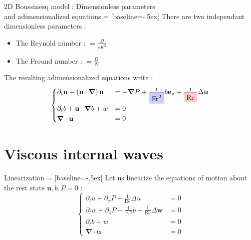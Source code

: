 \documentclass[10pt]{beamer}
\newcommand{\NodeFill}[3]{\tikz[baseline]{\node[fill=#1!20,anchor=base](#2){#3};}}
\begin{document}
\begin{frame}[fragile]{2D Boussinesq model : Dimensionless parameters \\and adimensionalized equations}
   = [baseline=-.5ex]
  There are two independant dimensionless parameters :
  \begin{itemize}
    \item The Reynold number : \NodeFill{red}{}{$\mathrm{Re}$}$=\frac{\Omega}{\nu K^{2}}$
    \item The Fround number : \NodeFill{blue}{}{$\mathrm{Fr}$}$=\frac{\Omega}{N}$
  \end{itemize}
  The resulting adimensionalized equations write :
  \begin{equation*}
    \begin{cases}
    \partial_{t}\mathbf{u}+\left(\mathbf{u}\cdot\boldsymbol{\nabla}\right)\mathbf{u} & = -\boldsymbol{\nabla}P+\frac{1}{\NodeFill{blue}{}{$\mathrm{Fr}^{2}$}}b\mathbf{e}_{z}+\frac{1}{\NodeFill{red}{}{$\mathrm{Re}$}}\Delta\mathbf{u} \\ 
    \partial_{t}b+\mathbf{u}\cdot\boldsymbol{\nabla}b+w& =0\\ 
    \boldsymbol{\nabla}\cdot\mathbf{u}& =0
    \end{cases}
  \end{equation*}
\end{frame}

\section{Viscous internal waves}

\begin{frame}[fragile]{Linearization}
   = [baseline=-.5ex]
  Let us linearize the equations of motion about the rest state $\mathrm{\mathbf{u}},b,P=0$ :
  \begin{equation*}
    \begin{cases}
    \partial_{t}u +\partial_{x}P-\frac{1}{\mathrm{Re}}\Delta u& = 0\\ 
    \partial_{t}w +\partial_{z}P-\frac{1}{\mathrm{Fr}^{2}}b-\frac{1}{\mathrm{Re}}\Delta\mathbf{w} & = 0 \\ 
    \partial_{t}b+w& =0\\ 
    \boldsymbol{\nabla}\cdot\mathbf{u}& =0
    \end{cases}
  \end{equation*}
\end{frame}
\end{document}
